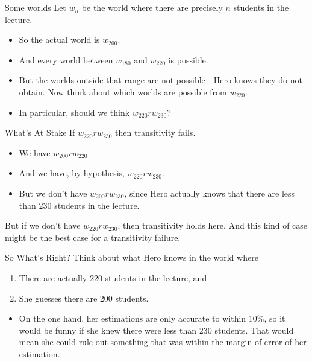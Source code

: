 \documentclass[
  14pt,
  letterpaper,
  ignorenonframetext,
  handout]{beamer}
\providecommand{\tightlist}{%
  \setlength{\itemsep}{0pt}\setlength{\parskip}{0pt}}\usepackage{longtable,booktabs,array}
\begin{document}
\begin{frame}{Some worlds}
\protect\hypertarget{some-worlds}{}
Let \(w_n\) be the world where there are precisely \(n\) students in the
lecture.

\begin{itemize}
\tightlist
\item
  So the actual world is \(w_{200}\).
\item
  And every world between \(w_{180}\) and \(w_{220}\) is possible.
  \pause 
\item
  But the worlds outside that range are not possible - Hero knows they
  do not obtain. \pause Now think about which worlds are possible from
  \(w_{220}\). \pause 
\item
  In particular, should we think \(w_{220}rw_{230}\)?
\end{itemize}
\end{frame}

\begin{frame}{What's At Stake}
\protect\hypertarget{whats-at-stake}{}
If \(w_{220}rw_{230}\) then transitivity fails.

\begin{itemize}
\tightlist
\item
  We have \(w_{200}rw_{220}\).
\item
  And we have, by hypothesis, \(w_{220}rw_{230}\).
\item
  But we don't have \(w_{200}rw_{230}\), since Hero actually knows that
  there are less than 230 students in the lecture. \pause 
\end{itemize}

But if we don't have \(w_{220}rw_{230}\), then transitivity holds here.
And this kind of case might be the best case for a transitivity failure.
\end{frame}

\begin{frame}{So What's Right?}
\protect\hypertarget{so-whats-right}{}
Think about what Hero knows in the world where

\begin{enumerate}
\tightlist
\item
  There are actually 220 students in the lecture, and
\item
  She guesses there are 200 students. \pause 
\end{enumerate}

\begin{itemize}
\tightlist
\item
  On the one hand, her estimations are only accurate to within 10\%, so
  it would be funny if she knew there were less than 230 students. That
  would mean she could rule out something that was within the margin of
  error of her estimation.
\end{itemize}
\end{frame}
\end{document}
